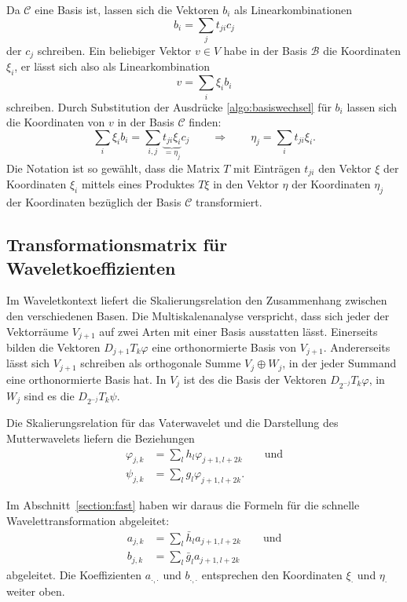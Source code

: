 Da $\mathcal{C}$ eine Basis ist, lassen sich die Vektoren $b_i$ als
Linearkombinationen
\begin{equation}
b_i = \sum_{j}  t_{ji}c_j
\label{algo:basiswechsel}
\end{equation}
der $c_j$ schreiben.
Ein beliebiger Vektor $v\in V$ habe in der Basis $\mathcal{B}$ die
Koordinaten $\xi_i$, er lässt sich also als Linearkombination
\[
v=\sum_{i} \xi_i b_i
\]
schreiben.
Durch Substitution der Ausdrücke \eqref{algo:basiswechsel} für $b_i$
lassen sich die Koordinaten von $v$ in der Basis $\mathcal{C}$ finden:
\[
\sum_{i} \xi_i b_i
=
\sum_{i,j} \underbrace{t_{ji}\xi_i}_{\displaystyle=\eta_j} c_j
\qquad\Rightarrow\qquad
\eta_j = \sum_{i} t_{ji} \xi _i.
\]
Die Notation ist so gewählt, dass die Matrix $T$ mit Einträgen $t_{ji}$ 
den Vektor $\xi$ der Koordinaten $\xi_i$ mittels eines Produktes $T\xi$
in den Vektor $\eta$ der Koordinaten $\eta_j$ der Koordinaten bezüglich
der Basis $\mathcal{C}$ transformiert.

\subsection{Transformationsmatrix für Waveletkoeffizienten}
Im Waveletkontext liefert die Skalierungsrelation den Zusammenhang
zwischen den verschiedenen Basen.
Die Multiskalenanalyse verspricht, dass sich jeder der Vektorräume
$V_{j+1}$ auf zwei Arten mit einer Basis ausstatten lässt.
Einerseits bilden die Vektoren $D_{j+1}T_k\varphi$ eine orthonormierte
Basis von $V_{j+1}$.
Andererseits lässt sich $V_{j+1}$ schreiben als orthogonale Summe
$V_j\oplus W_j$, in der jeder Summand eine orthonormierte Basis hat.
In $V_j$ ist des die Basis der Vektoren $D_{2^{-j}}T_k\varphi$, in $W_j$
sind es die $D_{2^{-j}}T_k\psi$.

Die Skalierungsrelation für das Vaterwavelet und die Darstellung des
Mutterwavelets liefern die Beziehungen
\begin{align*}
\varphi_{j,k} &= \sum_{l} h_{l}\varphi_{j+1,l+2k}
\qquad\text{und}
\\
\psi_{j,k} &= \sum_{l} g_{l} \varphi_{j+1,l+2k}.
\end{align*}

Im Abschnitt~\ref{section:fast} haben wir daraus die Formeln für
die schnelle Wavelettransformation abgeleitet:
\begin{align*}
a_{j,k} &= \sum_{l} \bar{h}_l a_{j+1,l+2k} \qquad\text{und}
\\
b_{j,k} &= \sum_{l} \bar{g}_l a_{j+1,l+2k}
\end{align*}
abgeleitet.
Die Koeffizienten $a_{\cdot,\cdot}$ und $b_{\cdot,\cdot}$ entsprechen
den Koordinaten $\xi_{\cdot}$ und $\eta_{\cdot}$ weiter oben.

